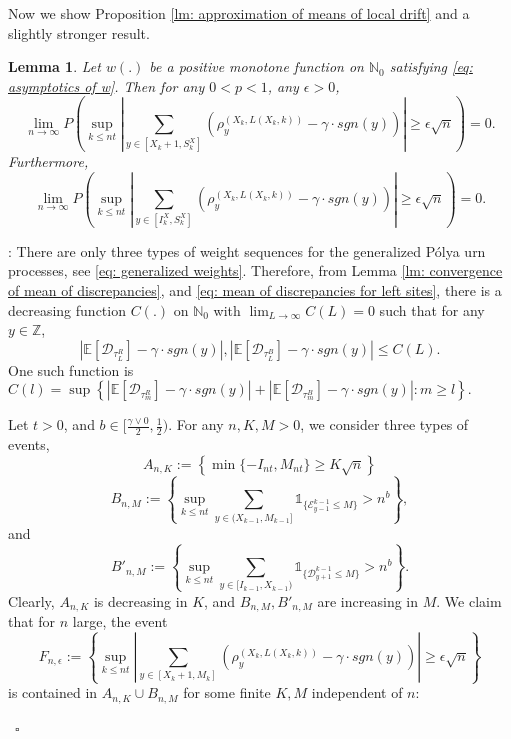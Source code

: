 \documentclass[twoside,12pt,a4paper]{article}
\newtheorem{lemma}{Lemma}[section]
\numberwithin{equation}{section}
\newenvironment{proof}{{\sc Proof}:}{~\hfill $\square$}
\newcommand{\abs}[1]{\left\vert #1 \right\vert}
\begin{document}
{Now we show Proposition \ref{lm: approximation of means of local drift} and a slightly stronger result. 
\begin{lemma}
	Let $w(.)$ be a positive monotone function on $\mathbb{N}_0$ satisfying \eqref{eq: asymptotics of w}. Then for any $0<p<1$, any $\epsilon>0$,
	$$
	\lim_{n\to\infty} P\left( \sup_{k\leq n t}  \abs{  	\sum_{y\in [X_{k}+1 ,S_{k}^X]} \left( \rho^{(X_k,L(X_k,k))}_y -  \gamma \cdot sgn(y) \right) } \geq  \epsilon \sqrt{n}     \right) =0.
	$$
	Furthermore,
		$$
	\lim_{n\to\infty} P\left( \sup_{k\leq n t}  \abs{  	\sum_{y\in [I_k^{X} ,S_{k}^X]} \left( \rho^{(X_k,L(X_k,k))}_y -  \gamma \cdot sgn(y) \right) } \geq  \epsilon \sqrt{n}     \right) =0.
	$$
\end{lemma}
\begin{proof} There are only three types of weight sequences for the generalized P\'{o}lya urn processes, see \eqref{eq: generalized weights}. Therefore, from Lemma \ref{lm: convergence of mean of discrepancies}, and \eqref{eq: mean of discrepancies for left sites}, there is a decreasing function $C(.)$ on $\mathbb{N}_0$ with $\lim_{L\to \infty}C(L) =0$ such that for any $y \in \mathbb{Z}$,
	\begin{equation}\label{eq: uniform convergence}
		\abs{\mathbb{E}\left[ \mathcal{D}_{\tau_L^R} \right] - \gamma \cdot sgn(y)}, \abs{\mathbb{E}\left[ \mathcal{D}_{\tau_L^B} \right] - \gamma \cdot sgn(y)} \leq C(L).
	\end{equation} One such function is $C(l) = \sup \left\{  \abs{\mathbb{E}\left[ \mathcal{D}_{\tau_m^R} \right] - \gamma \cdot sgn(y)} + \abs{\mathbb{E}\left[ \mathcal{D}_{\tau_m^B} \right] - \gamma \cdot sgn(y)} : m\geq l \right\}.     $  
	
	
	Let $t>0$, and $b \in [\frac{\gamma \vee 0 }{2},\frac{1}{2})$.  For any $n,K,M>0$, we consider three types of events, 
	$$A_{n,K}:=\left\{ \min\{-I_{nt}, M_{nt}\} \geq K \sqrt{n}  \right\}$$
	$$B_{n,M}:= \left\{  \sup_{k\leq n t} \sum_{ y\in (X_{k-1}, M_{k-1}]}  \mathbb{1}_{\{ \mathcal{E}^{k-1}_{y-1} \leq M  \}} >n^b  \right\},  $$
	and 
	$$B'_{n,M}:=  \left\{  \sup_{k\leq n t} \sum_{ y\in [I_{k-1}, X_{k-1})}  \mathbb{1}_{\{ \mathcal{D}^{k-1}_{y+1} \leq M  \}} >n^b  \right\}.$$
Clearly, $A_{n,K}$ is decreasing in $K$, and $B_{n,M}, B'_{n,M}$ are increasing in $M$. We claim that for $n$ large, the event 
$$
F_{n,\epsilon}:= \left\{ \sup_{k\leq n t}  \abs{  	\sum_{y\in [X_{k}+1 ,M_k]} \left( \rho^{(X_k,L(X_k,k))}_y -  \gamma \cdot sgn(y) \right) } \geq  \epsilon \sqrt{n}    \right \}$$ is contained in $A_{n,K} \cup B_{n,M} $ for some finite $K, M$ independent of $n$:   


\end{proof}}
\end{document}
